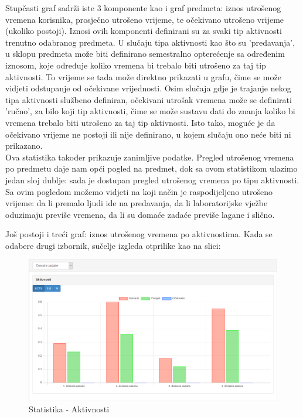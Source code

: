 \documentclass[times, utf8, zavrsni]{fer}
\begin{document}
Stupčasti graf sadrži iste 3 komponente kao i graf predmeta: iznos utrošenog vremena korisnika, prosječno utrošeno vrijeme, te očekivano utrošeno vrijeme (ukoliko postoji). Iznosi ovih komponenti definirani su za svaki tip aktivnosti trenutno odabranog predmeta. U slučaju tipa aktivnosti kao što su 'predavanja', u sklopu predmeta može biti definirano semestralno opterećenje sa određenim iznosom, koje određuje koliko vremena bi trebalo biti utrošeno za taj tip aktivnosti. To vrijeme se tada može direktno prikazati u grafu, čime se može vidjeti odstupanje od očekivane vrijednosti. Osim slučaja gdje je trajanje nekog tipa aktivnosti službeno definiran, očekivani utrošak vremena može se definirati 'ručno', za bilo koji tip aktivnosti, čime se može sustavu dati do znanja koliko bi vremena trebalo biti utrošeno za taj tip aktivnosti. Isto tako, moguće je da očekivano vrijeme ne postoji ili nije definirano, u kojem slučaju ono neće biti ni prikazano.\\

Ova statistika također prikazuje zanimljive podatke. Pregled utrošenog vremena po predmetu daje nam opći pogled na predmet, dok sa ovom statistikom ulazimo jedan sloj dublje: sada je dostupan pregled utrošenog vremena po tipu aktivnosti. Sa ovim pogledom možemo vidjeti na koji način je raspodijeljeno utrošeno vrijeme: da li premalo ljudi ide na predavanja, da li laboratorijske vježbe oduzimaju previše vremena, da li su domaće zadaće previše lagane i slično.

Još postoji i treći graf: iznos utrošenog vremena po aktivnostima. Kada se odabere drugi izbornik, sučelje izgleda otprilike kao na slici:

\begin{figure}[H]
\centering
\includegraphics[width=\textwidth,height=\textheight,keepaspectratio]{img/statistika-aktivnosti.png}
\caption{Statistika - Aktivnosti}
\label{fig:statistika-aktivnosti}
\end{figure}
\end{document}
